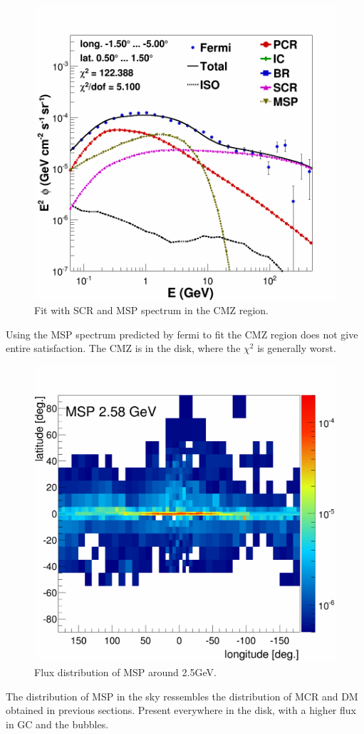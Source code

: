\begin{figure}[h]
  \centering
  \includegraphics[width=.5\linewidth]{pic/results/MSPonly_CMZ.png}
  \caption{Fit with SCR and MSP spectrum in the CMZ region.}
  \label{fig:MSP_only_CMZ}
\end{figure}


Using the MSP spectrum predicted by fermi   to fit the CMZ region does not give entire satisfaction. The CMZ is in the disk, where the $\chi^2$ is generally worst.



\begin{figure}[h]
  \centering
  \includegraphics[width=.5\linewidth]{pic/results/MSPonly_MSP_fluxE12_skymap.png}
  \caption{Flux distribution of MSP around 2.5GeV.}
  \label{fig:MSP_only_CMZ}
\end{figure}

The distribution of MSP in the sky ressembles the distribution of MCR and DM obtained in previous sections. Present everywhere in the disk, with a higher flux in GC and the bubbles.






















